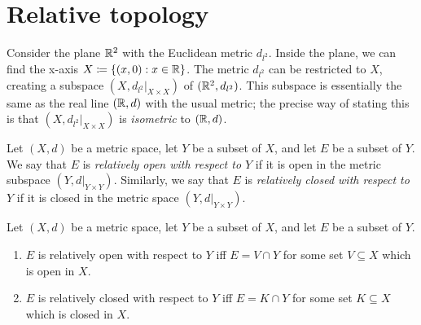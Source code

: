 \section{Relative topology}\label{ii:sec:1.3}

\begin{note}
  Consider the plane \(\mathbb{R}^2\) with the Euclidean metric \(d_{l^2}\).
  Inside the plane, we can find the x-axis \(X \coloneqq \left\lbrace(x, 0) : x \in \mathbb{R}\right\rbrace\).
  The metric \(d_{l^2}\) can be restricted to \(X\), creating a subspace \((X, d_{l^2}|_{X \times X})\) of \((\mathbb{R}^2, d_{l^2})\).
  This subspace is essentially the same as the real line \((\mathbb{R}, d)\) with the usual metric;
  the precise way of stating this is that \((X, d_{l^2}|_{X \times X})\) is \emph{isometric} to \((\mathbb{R}, d)\).
\end{note}

\setcounter{thm}{2}
\begin{defn}\label{ii:1.3.3}
  Let \((X, d)\) be a metric space, let \(Y\) be a subset of \(X\), and let \(E\) be a subset of \(Y\).
  We say that \(E\) is \emph{relatively open with respect to \(Y\)} if it is open in the metric subspace \((Y, d|_{Y \times Y})\).
  Similarly, we say that \(E\) is \emph{relatively closed with respect to \(Y\)} if it is closed in the metric space \((Y, d|_{Y \times Y})\).
\end{defn}

\begin{prop}\label{ii:1.3.4}
  Let \((X, d)\) be a metric space, let \(Y\) be a subset of \(X\), and let \(E\) be a subset of \(Y\).
  \begin{enumerate}
    \item\label{ii:1.3.4.a} \(E\) is relatively open with respect to \(Y\) iff \(E = V \cap Y\) for some set \(V \subseteq X\) which is open in \(X\).
    \item\label{ii:1.3.4.b} \(E\) is relatively closed with respect to \(Y\) iff \(E = K \cap Y\) for some set \(K \subseteq X\) which is closed in \(X\).
  \end{enumerate}
\end{prop}


